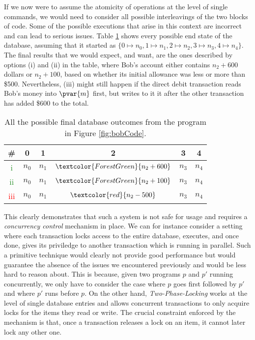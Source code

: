 If we now were to assume the atomicity of operations at the level of single commands, we would need to consider all possible interleavings of the two blocks of code. Some of the possible executions that arise in this context are incorrect and can lead to serious issues. Table \ref{table:bankOutcome} shows every possible end state of the database, assuming that it started as $\{ 0 \mapsto n_0, 1 \mapsto n_1, 2 \mapsto n_2, 3 \mapsto n_3, 4 \mapsto n_4 \}$. The final results that we would expect, and want, are the ones described by options (i) and (ii) in the table, where Bob's account either contains $n_2 + 600$ dollars or $n_2 + 100$, based on whether its initial allowance was less or more than \$500. Nevertheless, (iii) might still happen if the direct debit transaction reads Bob's money into $\pvar{m}$ first, but writes to it it after the other transaction has added \$$600$ to the total.

\bgroup
\setlength{\tabcolsep}{1.5em}
\def\arraystretch{1.5}
\begin{table}[h]
	\centering
	\caption{All the possible final database outcomes from the program in Figure \ref{fig:bobCode}.}
	\label{table:bankOutcome}
	\begin{tabular}{|c|c|c|c|c|c|}
	\hline
	\textbf{\#} & \textbf{0}         & \textbf{1}         & \textbf{2}         & \textbf{3}         & \textbf{4}         \\ \hline
	\textcolor{ForestGreen}{i}   & $n_0 $ & $n_1 $ & $\textcolor{ForestGreen}{n_2 + 600}$     & $n_3 $ & $n_4 $ \\ \hline
	\textcolor{ForestGreen}{ii}  & $n_0 $ & $n_1 $ & $\textcolor{ForestGreen}{n_2 + 100}$ & $n_3 $ & $n_4 $ \\ \hline
	\textcolor{red}{iii} & $n_0 $ & $n_1 $ & $\textcolor{red}{n_2 - 500}$  & $n_3 $ & $n_4 $ \\ \hline
	\end{tabular}
\end{table}
\egroup

This clearly demonstrates that such a system is not safe for usage and requires a \textit{concurrency control} mechanism in place. We can for instance consider a setting where each transaction locks access to the entire database, executes, and once done, gives its priviledge to another transaction which is running in parallel. Such a primitive technique would clearly not provide good performance but would guarantee the absence of the issues we encountered previously and would be less hard to reason about. This is because, given two programs $p$ and $p'$ running concurrently, we only have to consider the case where $p$ goes first followed by $p'$ and where $p'$ runs before $p$. On the other hand, \textit{Two-Phase-Locking} works at the level of single database entries and allows concurrent transactions to only acquire locks for the items they read or write. The crucial constraint enforced by the mechanism is that, once a transaction releases a lock on an item, it cannot later lock any other one. 

